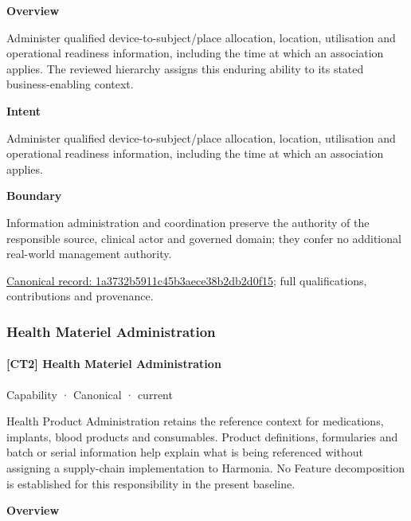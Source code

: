 \textbf{Overview}



Administer qualified device-to-subject/place allocation, location, utilisation and operational readiness information, including the time at which an association applies. The reviewed hierarchy assigns this enduring ability to its stated business-enabling context.



\textbf{Intent}



Administer qualified device-to-subject/place allocation, location, utilisation and operational readiness information, including the time at which an association applies.



\textbf{Boundary}



Information administration and coordination preserve the authority of the responsible source, clinical actor and governed domain; they confer no additional real-world management authority.


{\footnotesize \href{../../../../continuum/strategy/capability/1a3732b5911c45b3aece38b2db2d0f15.md}{Canonical record: 1a3732b5911c45b3aece38b2db2d0f15}; full qualifications, contributions and provenance.}\par
\subsubsection{Health Materiel Administration}

\paragraph{[CT2] Health Materiel Administration}

\label{element:e7081070a9f8444f81c1d8fce37ef664}
{\small Capability · Canonical · current}\par

Health Product Administration retains the reference context for medications, implants, blood products and consumables. Product definitions, formularies and batch or serial information help explain what is being referenced without assigning a supply-chain implementation to Harmonia. No Feature decomposition is established for this responsibility in the present baseline.



\textbf{Overview}



